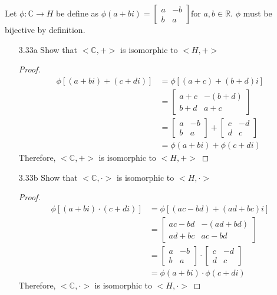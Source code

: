 \documentclass[12pt]{article}
\newcommand{\C}{\mathbb{C}}
\newcommand{\R}{\mathbb{R}}
\begin{document}
\begin{enumerate}
\begin{enumerate}
			Let $ \phi : \C \rightarrow H $ be define as $ \phi(a+bi) = \begin{bmatrix}a & -b \\b & a \end{bmatrix} \text {for } a,b\in\R $. $ \phi $ must be bijective by definition.
			\begin{enumerate}
				\item[3.33a] Show that $<\C,+>$ is isomorphic to $<H,+>$ 
					\begin{proof}
						\begin{align*}
							\phi[(a+bi)+(c+di)] &= \phi[(a+c)+(b+d)i]\\
												&= \begin{bmatrix}
												a+c & -(b+d) \\
												b+d & a+c 
												\end{bmatrix}\\
												&=\begin{bmatrix}
												a & -b \\
												b & a 
												\end{bmatrix} + \begin{bmatrix}
												c & -d \\
												d & c 
												\end{bmatrix}\\
												&= \phi(a+bi)+\phi(c+di) 
						\end{align*}
						Therefore, $<\C,+>$ is isomorphic to $<H,+>$
					\end{proof}
				\item[3.33b] Show that $<\C,\cdot>$ is isomorphic to $<H,\cdot>$
				\begin{proof}
					\begin{align*}
					\phi[(a+bi)\cdot(c+di)] &= \phi[(ac-bd)+(ad+bc)i]\\
											&= \begin{bmatrix}
											ac-bd & -(ad+bd) \\
											ad+bc & ac-bd 
											\end{bmatrix} \\
											&=  \begin{bmatrix}
											a & -b \\
											b & a 
											\end{bmatrix} \cdot \begin{bmatrix}
											c & -d \\
											d & c 
											\end{bmatrix}\\
											&= \phi(a+bi)\cdot\phi(c+di)
					\end{align*}
					Therefore,  $<\C,\cdot>$ is isomorphic to $<H,\cdot>$
				\end{proof}
			\end{enumerate}
		\end{enumerate}
		
		
	\end{enumerate}
\end{document}
